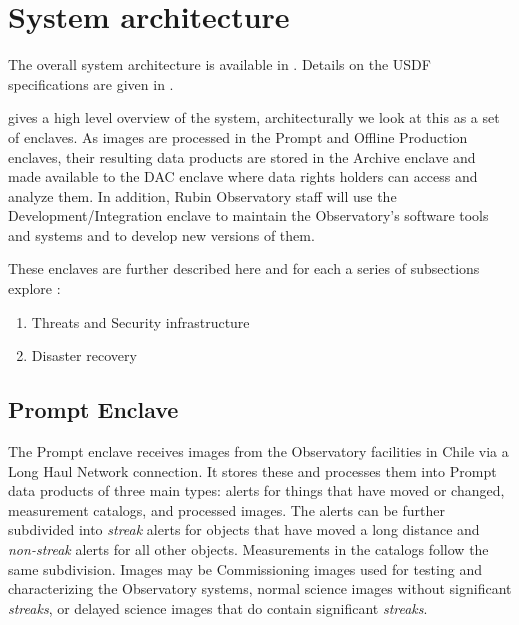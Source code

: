 

\section{System architecture} \label{sec:arc}
The overall system architecture is available in .
Details on the USDF specifications are given in .

 gives a high level overview of the system, architecturally we look
at this as a set of enclaves.
As images are processed in the Prompt and Offline Production enclaves, their resulting data products are stored in the Archive enclave and made available to the DAC enclave where data rights holders can access and analyze them.
In addition, Rubin Observatory staff will use the Development/Integration enclave to maintain the Observatory's software tools and systems and to develop new versions of them.

These enclaves are further described here and for each a series of subsections explore :


\begin{enumerate}
\item Threats and Security infrastructure
\item Disaster recovery
\end{enumerate}

\subsection{Prompt Enclave}

The Prompt enclave receives images from the Observatory facilities in Chile via a Long Haul Network connection.
It stores these and processes them into Prompt data products of three main types:
alerts for things that have moved or changed, measurement catalogs, and processed images.
The alerts can be further subdivided into \emph{streak} alerts for objects that have moved a long distance and \emph{non-streak} alerts for all other objects.
Measurements in the catalogs follow the same subdivision. Images may be Commissioning images used for testing and characterizing the Observatory systems, normal science images without significant \emph{streaks}, or delayed science images that do contain significant \emph{streaks}.

